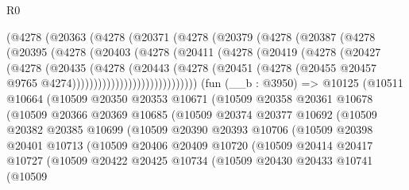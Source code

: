 \begin{lexlean}{R0}
\begin{coremodule}
          (@4278
            (@20363
              (@4278
                (@20371
                  (@4278
                    (@20379
                      (@4278
                        (@20387
                          (@4278
                            (@20395
                              (@4278
                                (@20403
                                  (@4278
                                    (@20411
                                      (@4278
                                        (@20419
                                          (@4278
                                            (@20427
                                              (@4278
                                                (@20435
                                                  (@4278
                                                    (@20443
                                                      (@4278
                                                        (@20451
                                                          (@4278
                                                            (@20455
                                                              @20457
                                                              @9765
                                                              @4274)))))))))))))))))))))))))))))
    (fun (__b : @3950) =>
    @10125
      (@10511
        @10664
        (@10509
          @20350
          @20353
          @10671
          (@10509
            @20358
            @20361
            @10678
            (@10509
              @20366
              @20369
              @10685
              (@10509
                @20374
                @20377
                @10692
                (@10509
                  @20382
                  @20385
                  @10699
                  (@10509
                    @20390
                    @20393
                    @10706
                    (@10509
                      @20398
                      @20401
                      @10713
                      (@10509
                        @20406
                        @20409
                        @10720
                        (@10509
                          @20414
                          @20417
                          @10727
                          (@10509
                            @20422
                            @20425
                            @10734
                            (@10509
                              @20430
                              @20433
                              @10741
                              (@10509

\end{coremodule}
\end{lexlean}
